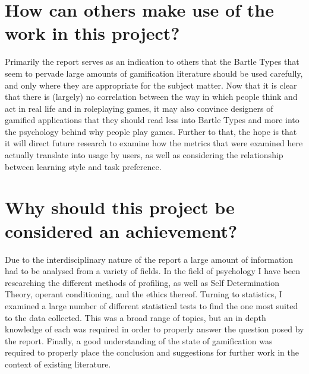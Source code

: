 \documentclass[12pt,a4paper,twoside]{report}
\begin{document}
\section{How can others make use of the work in this project?}
Primarily the report serves as an indication to others that the Bartle Types that seem to pervade large amounts of gamification literature should be used carefully, and only where they are appropriate for the subject matter. Now that it is clear that there is (largely) no correlation between the way in which people think and act in real life and in roleplaying games, it may also convince designers of gamified applications that they should read less into Bartle Types and more into the psychology behind why people play games. Further to that, the hope is that it will direct future research to examine how the metrics that were examined here actually translate into usage by users, as well as considering the relationship between learning style and task preference.

\section{Why should this project be considered an achievement?}
Due to the interdisciplinary nature of the report a large amount of information had to be analysed from a variety of fields. In the field of psychology I have been researching the different methods of profiling, as well as Self Determination Theory, operant conditioning, and the ethics thereof. Turning to statistics, I examined a large number of different statistical tests to find the one most suited to the data collected. This was a broad range of topics, but an in depth knowledge of each was required in order to properly answer the question posed by the report. Finally, a good understanding of the state of gamification was required to properly place the conclusion and suggestions for further work in the context of existing literature.
\end{document}
